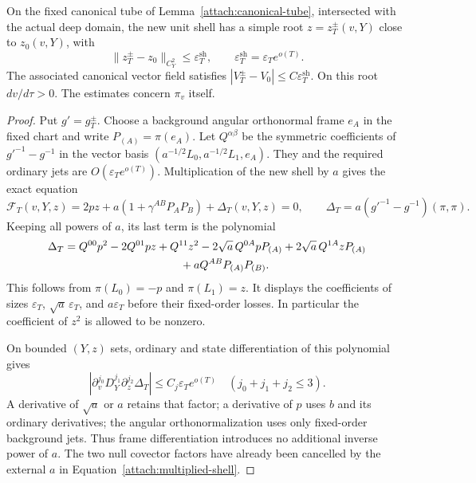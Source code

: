 \begin{lemma}\label{attach:absolute-shell}
On the fixed canonical tube of Lemma~\ref{attach:canonical-tube},
intersected with the actual deep domain, the new unit shell has a
simple root $z=z_T^\pm(v,Y)$ close to $z_0(v,Y)$, with
\begin{equation}\label{attach:root-bound}
 \lVert z_T^\pm-z_0\rVert_{C^2_Y}
 \le \varepsilon_T^{\mathrm{sh}},\qquad
 \varepsilon_T^{\mathrm{sh}}=\varepsilon_T e^{o(T)}.
\end{equation}
The associated canonical vector field satisfies
$|V_T^\pm-V_0|\le C\varepsilon_T^{\mathrm{sh}}$. On this root $dv/d\tau>0$.
The estimates concern $\pi_v$ itself.
\end{lemma}

\begin{proof}
Put $g'=g_T^\pm$. Choose a background angular orthonormal frame
$e_A$ in the fixed chart and write $P_{(A)}=\pi(e_A)$. Let
$Q^{\alpha\beta}$ be the symmetric coefficients of
$g'^{-1}-g^{-1}$ in the vector basis
$(a^{-1/2}L_0,a^{-1/2}L_1,e_A)$. They and the required ordinary jets
are $O(\varepsilon_T e^{o(T)})$. Multiplication of the new shell by
$a$ gives the exact equation
\begin{equation}\label{attach:multiplied-shell}
 \mathcal F_T(v,Y,z)
 =2pz+a(1+\gamma^{AB}P_AP_B)+\Delta_T(v,Y,z)=0,
 \qquad \Delta_T=a(g'^{-1}-g^{-1})(\pi,\pi).
\end{equation}
Keeping all powers of $a$, its last term is the polynomial
\begin{align}\label{attach:shell-polynomial}
 \Delta_T={}&Q^{00}p^2-2Q^{01}pz+Q^{11}z^2
       -2\sqrt a\,Q^{0A}pP_{(A)}
       +2\sqrt a\,Q^{1A}zP_{(A)}\notag\\
       &\hspace{32mm}+aQ^{AB}P_{(A)}P_{(B)}.
\end{align}
This follows from $\pi(L_0)=-p$ and $\pi(L_1)=z$.
It displays the coefficients of sizes $\varepsilon_T$,
$\sqrt a\,\varepsilon_T$, and $a\varepsilon_T$ before their
fixed-order losses. In particular the coefficient of $z^2$ is
allowed to be nonzero.

On bounded $(Y,z)$ sets, ordinary and state differentiation of this
polynomial gives
\begin{equation}\label{attach:polynomial-jets}
 |\partial_v^{j_0}D_Y^{j_1}\partial_z^{j_2}\Delta_T|
 \le C_j\varepsilon_T e^{o(T)}
 \quad (j_0+j_1+j_2\le3).
\end{equation}
A derivative of $\sqrt a$ or $a$ retains that factor; a derivative
of $p$ uses $b$ and its ordinary derivatives; the angular
orthonormalization uses only fixed-order background jets. Thus
frame differentiation introduces no additional inverse power of
$a$. The two null covector factors have already been cancelled by
the external $a$ in Equation~\eqref{attach:multiplied-shell}.


\end{proof}
